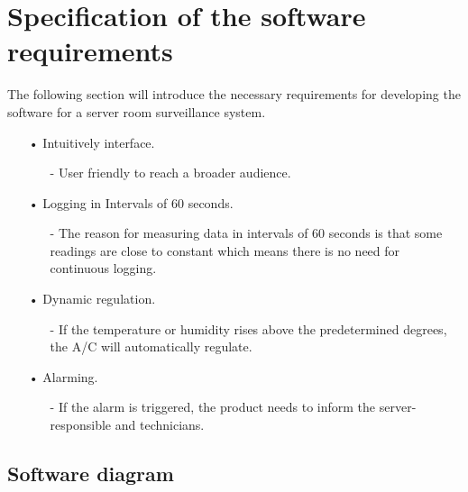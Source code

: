 
\section{Specification of the software requirements}
The following section will introduce the necessary requirements for developing the software for a server room surveillance system.\newline
\begin{enumerate}
	\item[•]Intuitively interface.
	\begin{enumerate}
		\item[-]User friendly to reach a broader audience.
	\end{enumerate}
	\item[•]Logging in Intervals of 60 seconds.
	\begin{enumerate}
		\item[-]The reason for measuring data in intervals of 60 seconds is that some readings are close to constant which means there is no need for continuous logging. 
	\end{enumerate}
	\item[•]Dynamic regulation.
	\begin{enumerate}
		\item[-]If the temperature or humidity rises above the predetermined degrees, the A/C will automatically regulate.
	\end{enumerate}
	\item[•]Alarming.
	\begin{enumerate}
		\item[-]If the alarm is triggered, the product needs to inform the server-responsible and technicians.
	\end{enumerate}
\end{enumerate}

\subsection{Software diagram}
